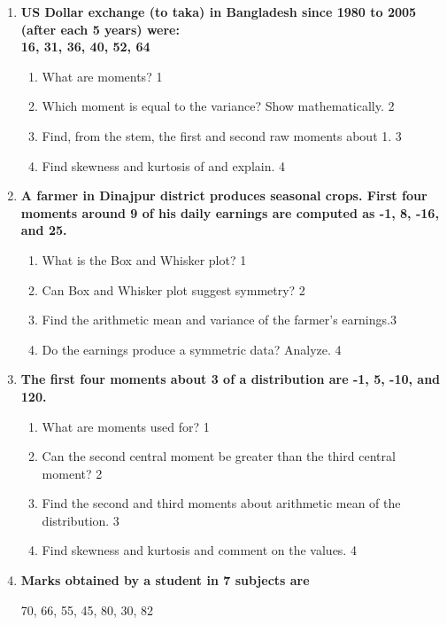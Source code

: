 \documentclass[a4paper,oneside]{book}
\begin{document}
  \begin{enumerate}
 \item
	  \textbf{US Dollar exchange (to taka) in Bangladesh since 1980 to 2005 (after each 5 years) were: \\ 16, 31, 36, 40, 52, 64} 
  
  \begin{enumerate}
    \item
	What are moments? \hfill 1
    \item
	Which moment is equal to the variance? Show mathematically. \hfill 2
    \item  
	Find, from the stem, the first and second raw moments about 1. \hfill 3
    \item
	Find skewness and kurtosis of and explain. \hfill 4
\end{enumerate}

 \item
	  \textbf{A farmer in Dinajpur district produces seasonal crops. First four moments around 9 of his daily earnings are computed as -1, 8, -16, and 25.}
  
  \begin{enumerate}
    \item
	What is the Box and Whisker plot? \hfill 1
    \item
	Can Box and Whisker plot suggest symmetry? \hfill 2
    \item  
	 Find the arithmetic mean and variance of the farmer's earnings.\hfill 3
    \item
	Do the earnings produce a symmetric data? Analyze. \hfill 4
  \end{enumerate}

 \item
	  \textbf{The first four moments about 3 of a distribution are -1, 5, -10, and 120.} 
  
  \begin{enumerate}
    \item
	What are moments used for? \hfill 1
    \item
	Can the second central moment be greater than the third central moment? \hfill 2
    \item  
	Find the second and third moments about arithmetic mean of the distribution. \hfill 3
    \item
	Find skewness and kurtosis and comment on the values.  \hfill 4
\end{enumerate}

 \item
	  \textbf{Marks obtained by a student in 7 subjects are} 
	  \begin{center}
	  70, 66, 55, 45, 80, 30, 82
	\end{center}
  

\end{enumerate}
\end{document}
